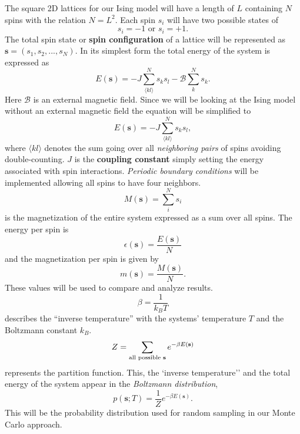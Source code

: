 \documentclass[english,notitlepage,reprint,nofootinbib]{revtex4-1}  %
\begin{document}
The square 2D lattices for our Ising model will have a length of $L$ containing $N$ spins with the relation $N = L^2$. Each spin $s_i$ will have two possible states of
\begin{equation*}
    s_i = -1 \text{ or } s_i = +1.
\end{equation*}
The total spin state or \textbf{spin configuration} of a lattice will be represented as $\textbf{s} = (s_1, s_2, ..., s_N)$. In its simplest form the total energy of the system is expressed as
\begin{equation*}
    E(\textbf{s}) = - J \sum^N_{\langle kl \rangle} s_k s_l - \mathscr{B} \sum^N_{k} s_k.
\end{equation*}
Here $\mathscr{B}$ is an external magnetic field. Since we will be looking at the Ising model without an external magnetic field the equation will be simplified to
\begin{equation}
    E(\textbf{s}) = - J \sum^N_{\langle kl \rangle} s_k s_l,
\end{equation}
where $\langle kl \rangle$ denotes the sum going over all \textit{neighboring pairs} of spins avoiding double-counting. $J$ is the \textbf{coupling constant} simply setting the energy associated with spin interactions. \textit{Periodic boundary conditions} will be implemented allowing all spins to have four neighbors.
\begin{equation}
    M(\textbf{s}) = \sum^N_i s_i
\end{equation}
is the magnetization of the entire system expressed as a sum over all spins. The energy per spin is
\begin{equation}
    \epsilon(\textbf{s}) = \frac{E(\textbf{s})}{N} \label{eq:mean_E}
\end{equation}
and the magnetization per spin is given by
\begin{equation}
    m(\textbf{s}) = \frac{M(\textbf{s})}{N}. \label{eq:mean_M}
\end{equation}
These values will be used to compare and analyze results.
\begin{equation}
    \beta = \frac{1}{k_B T}
\end{equation}
describes the ``inverse temperature'' with the systems' temperature $T$ and the Boltzmann constant $k_B$.
\begin{equation}
    Z = \sum_{\text{all possible \textbf{s}}} e^{- \beta E(\textbf{s})}
\end{equation}
represents the partition function. This, the `inverse temperature'' and the total energy of the system appear in the \textit{Boltzmann distribution},
\begin{equation}
    p(\textbf{s};T) = \frac{1}{Z} e^{-\beta E(\textbf{s})}.\label{eq:prob_dist}
\end{equation}
This will be the probability distribution used for random sampling in our Monte Carlo approach.
\end{document}
